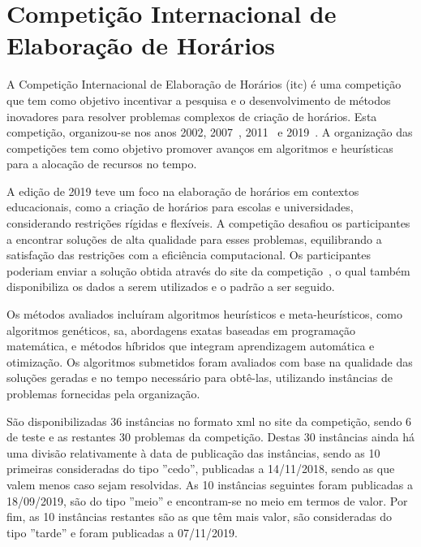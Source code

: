 



\section{Competição Internacional de Elaboração de Horários}
\label{capitulo2:ITC}

A Competição Internacional de Elaboração de Horários (\gls{itc}) é uma competição que tem como objetivo incentivar a pesquisa e o desenvolvimento de métodos inovadores para resolver problemas complexos de criação de horários. Esta competição, organizou-se nos anos 2002, 2007~\cite{SecondInternationalTimetabling-Mccollum-2007}, 2011~\cite{ThirdInternationalTimetabling-Post-2013} e 2019~\cite{Realworlduniversity-Mueller-2024}. A organização das competições tem como objetivo promover avanços em algoritmos e heurísticas para a alocação de recursos no tempo.

A edição de 2019 teve um foco na elaboração de horários em contextos educacionais, como a criação de horários para escolas e universidades, considerando restrições rígidas e flexíveis. A competição desafiou os participantes a encontrar soluções de alta qualidade para esses problemas, equilibrando a satisfação das restrições com a eficiência computacional. Os participantes poderiam enviar a solução obtida através do site da competição~\cite{itc2019-Website}, o qual também disponibiliza os dados a serem utilizados e o padrão a ser seguido.

Os métodos avaliados incluíram algoritmos heurísticos e meta-heurísticos, como algoritmos genéticos, \gls{sa}, abordagens exatas baseadas em programação matemática, e métodos híbridos que integram aprendizagem automática e otimização. Os algoritmos submetidos foram avaliados com base na qualidade das soluções geradas e no tempo necessário para obtê-las, utilizando instâncias de problemas fornecidas pela organização.

São disponibilizadas 36 instâncias no formato \gls{xml} no site da competição, sendo 6 de teste e as restantes 30 problemas da competição. Destas 30 instâncias ainda há uma divisão relativamente à data de publicação das instâncias, sendo as 10 primeiras consideradas do tipo ''cedo'', publicadas a 14/11/2018, sendo as que valem menos caso sejam resolvidas. As 10 instâncias seguintes foram publicadas a 18/09/2019, são do tipo ''meio'' e encontram-se no meio em termos de valor. Por fim, as 10 instâncias restantes são as que têm mais valor, são consideradas do tipo ''tarde'' e foram publicadas a 07/11/2019.

